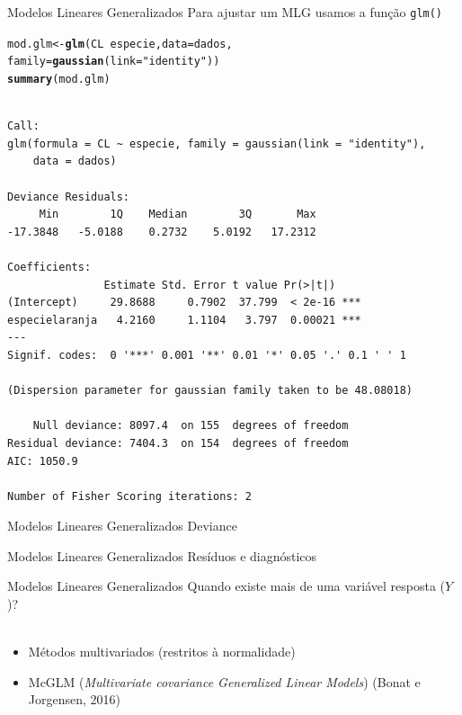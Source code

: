 \documentclass[10pt]{beamer}\usepackage[]{graphicx}\usepackage[]{color}
\makeatletter
\newcommand{\hlstr}[1]{\textcolor[rgb]{0.192,0.494,0.8}{#1}}%
\newcommand{\hlopt}[1]{\textcolor[rgb]{0,0,0}{#1}}%
\newcommand{\hlstd}[1]{\textcolor[rgb]{0.345,0.345,0.345}{#1}}%
\newcommand{\hlkwb}[1]{\textcolor[rgb]{0.69,0.353,0.396}{#1}}%
\newcommand{\hlkwc}[1]{\textcolor[rgb]{0.333,0.667,0.333}{#1}}%
\newcommand{\hlkwd}[1]{\textcolor[rgb]{0.737,0.353,0.396}{\textbf{#1}}}%
\newenvironment{kframe}{%
 \def\at@end@of@kframe{}%
 \ifinner\ifhmode%
  \def\at@end@of@kframe{\end{minipage}}%
  \begin{minipage}{\columnwidth}%
 \fi\fi%
 \def\FrameCommand##1{\hskip\@totalleftmargin \hskip-\fboxsep
 \colorbox{shadecolor}{##1}\hskip-\fboxsep
     \hskip-\linewidth \hskip-\@totalleftmargin \hskip\columnwidth}%
 \MakeFramed {\advance\hsize-\width
   \@totalleftmargin\z@ \linewidth\hsize
   \@setminipage}}%
 {\par\unskip\endMakeFramed%
 \at@end@of@kframe}
\newenvironment{knitrout}{}{} %
\theoremstyle{definition}
\makeatother
\begin{document}
\begin{frame}[fragile]{Modelos Lineares Generalizados}
Para ajustar um MLG usamos a função \texttt{glm()}
\begin{knitrout}\footnotesize
{}\color{fgcolor}\begin{kframe}
\begin{alltt}
\hlstd{mod.glm} \hlkwb{<-} \hlkwd{glm}\hlstd{(CL} \hlopt{~} \hlstd{especie,} \hlkwc{data} \hlstd{= dados,}
               \hlkwc{family} \hlstd{=} \hlkwd{gaussian}\hlstd{(}\hlkwc{link} \hlstd{=} \hlstr{"identity"}\hlstd{))}
\hlkwd{summary}\hlstd{(mod.glm)}
\end{alltt}
\begin{verbatim}

Call:
glm(formula = CL ~ especie, family = gaussian(link = "identity"), 
    data = dados)

Deviance Residuals: 
     Min        1Q    Median        3Q       Max  
-17.3848   -5.0188    0.2732    5.0192   17.2312  

Coefficients:
               Estimate Std. Error t value Pr(>|t|)    
(Intercept)     29.8688     0.7902  37.799  < 2e-16 ***
especielaranja   4.2160     1.1104   3.797  0.00021 ***
---
Signif. codes:  0 '***' 0.001 '**' 0.01 '*' 0.05 '.' 0.1 ' ' 1

(Dispersion parameter for gaussian family taken to be 48.08018)

    Null deviance: 8097.4  on 155  degrees of freedom
Residual deviance: 7404.3  on 154  degrees of freedom
AIC: 1050.9

Number of Fisher Scoring iterations: 2
\end{verbatim}
\end{kframe}
\end{knitrout}
\end{frame}

\begin{frame}[fragile]{Modelos Lineares Generalizados}
  Deviance
\end{frame}

\begin{frame}[fragile]{Modelos Lineares Generalizados}
  Resíduos e diagnósticos
\end{frame}

\begin{frame}[fragile]{Modelos Lineares Generalizados}
  Quando existe mais de uma variável resposta ($Y$)? \\~\\
  \begin{itemize}
  \item Métodos multivariados (restritos à normalidade)
  \item McGLM (\textit{Multivariate covariance Generalized Linear
      Models}) (Bonat e Jorgensen, 2016)
  \end{itemize}

\end{frame}
\end{document}
